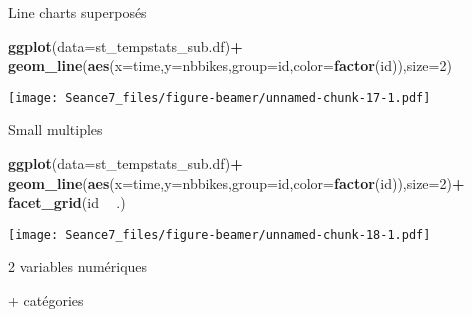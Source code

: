 \documentclass[ignorenonframetext,]{beamer}
\newenvironment{Shaded}{\begin{snugshade}}{\end{snugshade}}
\newcommand{\DataTypeTok}[1]{\textcolor[rgb]{0.13,0.29,0.53}{#1}}
\newcommand{\DecValTok}[1]{\textcolor[rgb]{0.00,0.00,0.81}{#1}}
\newcommand{\KeywordTok}[1]{\textcolor[rgb]{0.13,0.29,0.53}{\textbf{#1}}}
\newcommand{\NormalTok}[1]{#1}
\newcommand{\OperatorTok}[1]{\textcolor[rgb]{0.81,0.36,0.00}{\textbf{#1}}}
\newcommand{\StringTok}[1]{\textcolor[rgb]{0.31,0.60,0.02}{#1}}
\begin{document}
\begin{frame}[fragile]{Line charts superposés}
\protect\hypertarget{line-charts-superposuxe9s}{}

\begin{Shaded}
\begin{Highlighting}[]
\KeywordTok{ggplot}\NormalTok{(}\DataTypeTok{data=}\NormalTok{st_tempstats_sub.df)}\OperatorTok{+}
\StringTok{  }\KeywordTok{geom_line}\NormalTok{(}\KeywordTok{aes}\NormalTok{(}\DataTypeTok{x=}\NormalTok{time,}\DataTypeTok{y=}\NormalTok{nbbikes,}\DataTypeTok{group=}\NormalTok{id,}\DataTypeTok{color=}\KeywordTok{factor}\NormalTok{(id)),}\DataTypeTok{size=}\DecValTok{2}\NormalTok{)}
\end{Highlighting}
\end{Shaded}

\texttt{[image: Seance7\_files/figure-beamer/unnamed-chunk-17-1.pdf]}

\end{frame}

\begin{frame}[fragile]{Small multiples}
\protect\hypertarget{small-multiples}{}

\begin{Shaded}
\begin{Highlighting}[]
\KeywordTok{ggplot}\NormalTok{(}\DataTypeTok{data=}\NormalTok{st_tempstats_sub.df)}\OperatorTok{+}
\StringTok{  }\KeywordTok{geom_line}\NormalTok{(}\KeywordTok{aes}\NormalTok{(}\DataTypeTok{x=}\NormalTok{time,}\DataTypeTok{y=}\NormalTok{nbbikes,}\DataTypeTok{group=}\NormalTok{id,}\DataTypeTok{color=}\KeywordTok{factor}\NormalTok{(id)),}\DataTypeTok{size=}\DecValTok{2}\NormalTok{)}\OperatorTok{+}
\StringTok{  }\KeywordTok{facet_grid}\NormalTok{(id }\OperatorTok{~}\StringTok{ }\NormalTok{.)}
\end{Highlighting}
\end{Shaded}

\texttt{[image: Seance7\_files/figure-beamer/unnamed-chunk-18-1.pdf]}

\end{frame}

\begin{frame}{}
\protect\hypertarget{section-11}{}

{ 2 variables numériques}

{ + catégories}

\end{frame}
\end{document}
